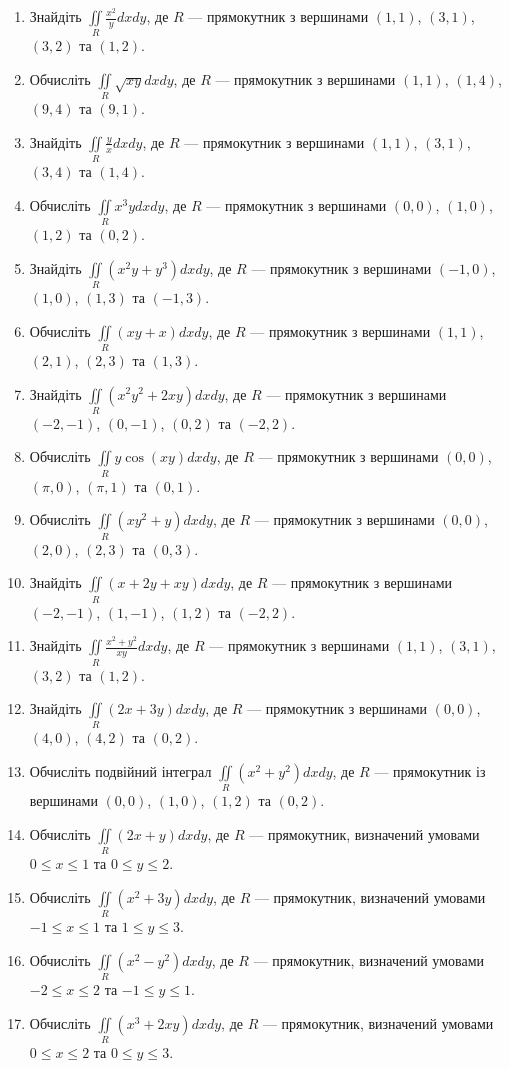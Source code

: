 \begin{enumerate}
\begin{enumerate}[label*=\arabic*.]
\item     Знайдіть $\iint\limits_{R} \frac{x^2}{y}  dx  dy$, де $R$ --- прямокутник з вершинами $(1, 1)$, $(3, 1)$, $(3, 2)$ та $(1, 2)$.
\item     Обчисліть $\iint\limits_{R} \sqrt{x y}  dx  dy$, де $R$ --- прямокутник з вершинами $(1, 1)$, $(1, 4)$, $(9, 4)$ та $(9, 1)$.
\item     Знайдіть $\iint\limits_{R} \frac{y}{x}  dx  dy$, де $R$ --- прямокутник з вершинами $(1, 1)$, $(3, 1)$, $(3, 4)$ та $(1, 4)$.
\item     Обчисліть $\iint\limits_{R} x^3y  dx  dy$, де $R$ --- прямокутник з вершинами $(0, 0)$, $(1, 0)$, $(1, 2)$ та $(0, 2)$.
\item     Знайдіть $\iint\limits_{R} (x^2y + y^3)  dx  dy$, де $R$ --- прямокутник з вершинами $(-1, 0)$, $(1, 0)$, $(1, 3)$ та $(-1, 3)$.
\item     Обчисліть $\iint\limits_{R} (xy + x)  dx  dy$, де $R$ --- прямокутник з вершинами $(1, 1)$, $(2, 1)$, $(2, 3)$ та $(1, 3)$.
\item     Знайдіть $\iint\limits_{R} (x^2y^2 + 2xy)  dx  dy$, де $R$ --- прямокутник з вершинами $(-2, -1)$, $(0, -1)$, $(0, 2)$ та $(-2, 2)$.
\item     Обчисліть $\iint\limits_{R} y \cos(xy)  dx  dy$, де $R$ --- прямокутник з вершинами $(0, 0)$, $(\pi, 0)$, $(\pi, 1)$ та $(0, 1)$.
\item     Обчисліть $\iint\limits_{R} (xy^2 + y)  dx  dy$, де $R$ --- прямокутник з вершинами $(0, 0)$, $(2, 0)$, $(2, 3)$ та $(0, 3)$.
\item     Знайдіть $\iint\limits_{R} (x + 2y + xy)  dx  dy$, де $R$ --- прямокутник з вершинами $(-2, -1)$, $(1, -1)$, $(1, 2)$ та $(-2, 2)$.
\item     Знайдіть $\iint\limits_{R} \frac{x^2 + y^2}{xy}  dx  dy$, де $R$ --- прямокутник з вершинами $(1, 1)$, $(3, 1)$, $(3, 2)$ та $(1, 2)$.
\item     Знайдіть $\iint\limits_{R} (2x + 3y) d x d y$, де $R$ --- прямокутник з вершинами $(0, 0)$, $(4, 0)$, $(4, 2)$ та $(0, 2)$.
\item Обчисліть подвійний інтеграл $\iint\limits_R (x^2 + y^2)  dx  dy$, де $R$ --- прямокутник із вершинами $(0, 0)$, $(1, 0)$, $(1, 2)$ та $(0, 2)$.
\item Обчисліть $\iint\limits_R (2x + y) dx dy$, де $R$ --- прямокутник, визначений умовами $0 \leq x \leq 1$ та $0 \leq y \leq 2$.
\item Обчисліть $\iint\limits_R (x^2 + 3y) dx dy$, де $R$ --- прямокутник, визначений умовами  $-1 \leq x \leq 1$ та $1 \leq y \leq 3$.
\item Обчисліть $\iint\limits_R (x^2 - y^2) dx dy$, де $R$ --- прямокутник, визначений умовами  $-2 \leq x \leq 2$ та $-1 \leq y \leq 1$.
\item Обчисліть $\iint\limits_R (x^3 + 2xy) dx dy$, де $R$ --- прямокутник, визначений умовами  $0 \leq x \leq 2$ та $0 \leq y \leq 3$.
\end{enumerate}
\end{enumerate}

